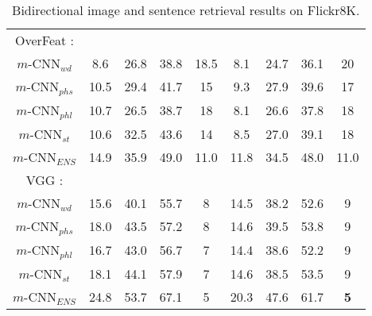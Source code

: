 \documentclass[10pt,twocolumn,letterpaper]{article}
\begin{document}
\begin{table*}
\begin{center}
\begin{tabular}{c|cccc|cccc}
        \hline
        \hline
        OverFeat \cite{sermanet_arxiv2014}:&&&&&&&& \\
        $m$-CNN$_{wd}$ & 8.6 &26.8 &38.8&18.5 &8.1 &24.7 &36.1&20\\
        $m$-CNN$_{phs}$ & 10.5 &29.4 &41.7&15 &9.3 &27.9 &39.6&17\\
        $m$-CNN$_{phl}$ & 10.7 &26.5 &38.7&18 &8.1 &26.6 &37.8&18\\
        $m$-CNN$_{st}$ & 10.6 &32.5 &43.6&14 &8.5 &27.0 &39.1&18\\
        $m$-CNN$_{ENS}$ & {14.9} &{35.9} &{49.0}&{11.0} &{11.8} &{34.5} &{48.0}&{11.0}\\
        \hline
        \hline
        VGG \cite{simonyan_arxiv2014}:&&&&&&&& \\
        $m$-CNN$_{wd}$ & 15.6 &40.1 &55.7&8 &14.5 & 38.2 &52.6&9\\
        $m$-CNN$_{phs}$ & 18.0 & 43.5 &57.2&8 &14.6 &39.5 &53.8&9\\
        $m$-CNN$_{phl}$ & 16.7 & 43.0 &56.7&7 &14.4 &38.6 &52.2&9\\
        $m$-CNN$_{st}$ & 18.1 &44.1 &57.9&7 &14.6 &38.5 &53.5&9\\
        $m$-CNN$_{ENS}$ &  {24.8} & {53.7}& {67.1}& {5} & {20.3} & {47.6} & {61.7}& \textbf{5}\\
        \hline
        \hline
    \end{tabular}


\end{center}
\caption{Bidirectional image and sentence retrieval results on Flickr8K.}\label{table:flickr8k}
\end{table*}
\end{document}

